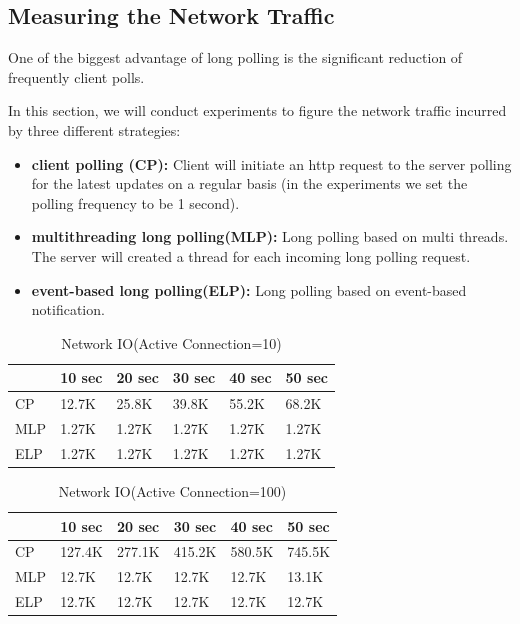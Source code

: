 \subsection{Measuring the Network Traffic\\}

One of the biggest advantage of long polling is the significant reduction of frequently client polls.

In this section, we will conduct experiments to figure the network traffic incurred by three different strategies:

\begin{itemize}
    \item {\bf client polling (CP): } Client will initiate an http request to the server polling for the latest updates on a regular basis (in the experiments we set the polling frequency to be 1 second).
    \item {\bf multithreading long polling(MLP): } Long polling based on multi threads. The server will created a thread for each incoming long polling request.
    \item {\bf event-based long polling(ELP): }Long polling based on event-based notification.
\end{itemize}

\begin{table}
\centering \caption{\label{tb:traffic} Network IO(Active Connection=10)}
\begin{tabular}{|l|l|l|l|l|l|}
    \hline  & 10 sec & 20 sec & 30 sec & 40 sec & 50 sec \\
    \hline CP & 12.7K & 25.8K & 39.8K & 55.2K & 68.2K \\
    \hline MLP & 1.27K & 1.27K & 1.27K & 1.27K & 1.27K \\
    \hline ELP & 1.27K & 1.27K & 1.27K & 1.27K & 1.27K \\
    \hline
\end{tabular}
\end{table}

\begin{table}
\centering \caption{\label{tb:traffic} Network IO(Active Connection=100)}
\begin{tabular}{|l|l|l|l|l|l|}
    \hline      & 10 sec & 20 sec & 30 sec & 40 sec & 50 sec \\
    \hline CP & 127.4K & 277.1K & 415.2K & 580.5K & 745.5K \\
    \hline MLP & 12.7K & 12.7K & 12.7K & 12.7K & 13.1K \\
    \hline ELP & 12.7K & 12.7K & 12.7K & 12.7K & 12.7K \\
    \hline
\end{tabular}
\end{table}

